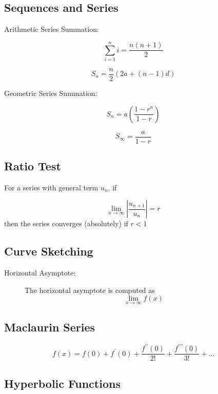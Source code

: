 \documentclass[a4paper,12pt]{article}
\begin{document}
	
	\subsection*{Sequences and Series}
Arithmetic Series Summation:
\begin{multicols}{2}	
	\[ \sum_{i=1}^{n} i = \frac{n(n+1)}{2}\]
	

	\[ S_n = \frac{n}{2} \left(2a + (n-1) d \right)\]
\end{multicols}	
	Geometric Series Summation:
	\begin{multicols}{2}
	\[ S_n = a\left(\frac{1-r^n}{1-r}\right)\]
	
	\[ S_\infty = \frac{a}{1-r}\]
	\end{multicols}
	
	
	\subsection*{Ratio Test}
	
	For a series with general term $u_n$, if
	
	\[ \lim_{n \to \infty } \left| \frac{u_{n+1}}{u_n} \right| = r\]
	then the series converges (absolutely) if $r<1$
	
	
	
	
	\subsection*{Curve Sketching}
	\begin{description}
		\item[Horizontal Asymptote:] The horizontal asymptote is computed as
		\[ \lim_{x \to \infty } f(x) \]
	\end{description}
	
	\subsection*{Maclaurin Series}
	\[f(x) = f(0) + f^{\prime}(0) + \frac{f^{\prime \prime}(0)}{2!} + \frac{f^{\prime\prime \prime}(0)}{3!} + \ldots \]
	
	\subsection*{Hyperbolic Functions }
	
\end{document}
